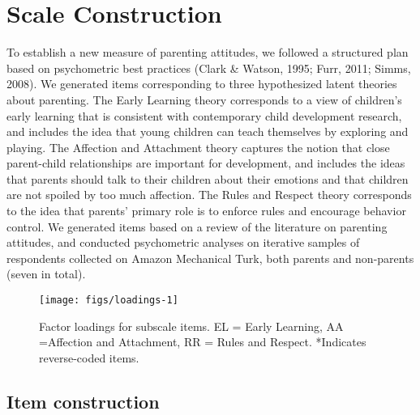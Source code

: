 \documentclass[10pt, letterpaper]{article}
\newenvironment{CodeChunk}{}{}
\begin{document}
\section{Scale Construction}\label{scale-construction}

To establish a new measure of parenting attitudes, we followed a
structured plan based on psychometric best practices (Clark \& Watson,
1995; Furr, 2011; Simms, 2008). We generated items corresponding to
three hypothesized latent theories about parenting. The Early Learning
theory corresponds to a view of children's early learning that is
consistent with contemporary child development research, and includes
the idea that young children can teach themselves by exploring and
playing. The Affection and Attachment theory captures the notion that
close parent-child relationships are important for development, and
includes the ideas that parents should talk to their children about
their emotions and that children are not spoiled by too much affection.
The Rules and Respect theory corresponds to the idea that parents'
primary role is to enforce rules and encourage behavior control. We
generated items based on a review of the literature on parenting
attitudes, and conducted psychometric analyses on iterative samples of
respondents collected on Amazon Mechanical Turk, both parents and
non-parents (seven in total).

\begin{CodeChunk}
\begin{figure*}

{\centering \texttt{[image: figs/loadings-1]} 

}

\caption[Factor loadings for subscale items]{Factor loadings for subscale items. EL = Early Learning, AA =Affection and Attachment, RR = Rules and Respect. *Indicates reverse-coded items.}\label{fig:loadings}
\end{figure*}
\end{CodeChunk}

\subsection{Item construction}\label{item-construction}
\end{document}
